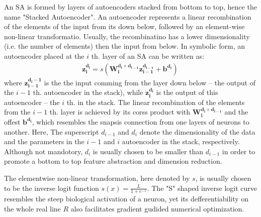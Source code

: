 An SA is formed by layers of autoencoders stacked from bottom to top, hence the name "Stacked Autoencoder". An autoencoder represents a linear recombination of the elements of the input from its down below, followed by an element-wise non-linear transformatio. Usually, the recombinatino has a lower dimensionality (i.e. the number of elements) then the input from below. In symbolic form, an autoencoder placed at the $i$ th. layer of an SA can be written as:
\begin{equation} \label{eq:AE}
  \begin{split}
    \boldsymbol{z_i^{d_i}} = s(\boldsymbol{W_i^{d_i\times d_{i-1}}z_{i-1}^{d_{i-1}}} + \boldsymbol{b^{d_i}})\,
  \end{split}
\end{equation}
where $\boldsymbol{z_{i-1}^{d_i-1}}$ is the the input comming from the layer down below -- the output of the $i-1$ th. autoencoder in the stack), while $\boldsymbol{z_i^{d_i}}$ is the output of this autoencoder -- the $i$ th. in the stack. The linear recombination of the elements from the $i-1$ th. layer is achieved by its corss product with $\boldsymbol{W_i^{d_i\times d_{i-1}}}$ and the offest $\boldsymbol{b^{d_i}}$, which resembles the snapsis connection from one layers of neurons to another. Here, The superscript $d_{i-1}$ and $d_i$ denote the dimensionality of the data and the parameters in the $i-1$ and $i$ autoencoder in the stack, respectively. Although not mandotory, $d_i$ is usually chosen to be smaller than $d_{i-1}$ in order to promote a bottom to top feature abstraction and dimension reduction.

The elementwise non-linear transformation, here denoted by $s$, is usually chosen to be the inverse logit function $s(x)=\frac{L}{1+e^{-x}}$. The "S" shaped inverse logit curve resembles the steep biological activation of a neuron, yet its defferentiability on the whole real line $R$ also facilitates gradient gudided numerical optimization. 

